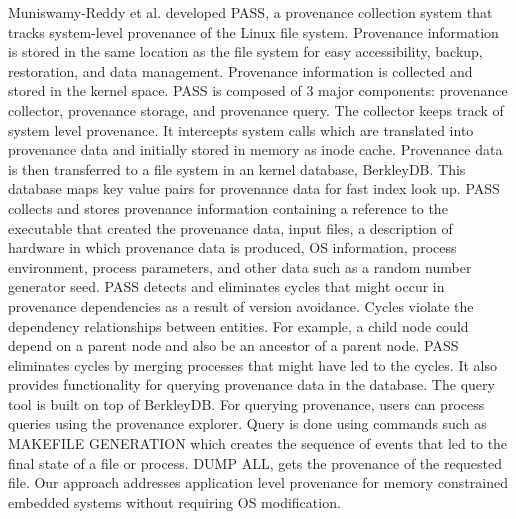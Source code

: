 Muniswamy-Reddy
et al. \cite{muniswamy_reddy} developed PASS, a provenance collection system that tracks  system-level provenance of the Linux file system. Provenance information
is stored in the same location as the file system for easy accessibility, backup,
restoration, and data management. Provenance information is collected and stored in
the kernel space. PASS is composed of 3 major components: provenance collector, provenance storage, and provenance query. The collector keeps track of system level provenance. It intercepts system calls which are translated into provenance data and initially stored in memory as inode cache. Provenance data is then transferred to a file system in an kernel database, BerkleyDB. This database maps key value pairs for provenance data for fast index look up. PASS collects and stores provenance information containing a reference to the executable that created the provenance data, input files, a description of hardware in which provenance data is produced, OS information, process environment, process parameters, and other data such as a random number generator seed. PASS detects and eliminates cycles that might occur in provenance dependencies as a result of version avoidance. Cycles violate the dependency relationships between entities. For example, a child node could depend on a parent node and also be an ancestor of a parent node. PASS eliminates cycles by merging processes that might have led to the cycles. It also provides functionality for querying provenance data in the database. The query tool is built on top of BerkleyDB. For querying provenance, users can process queries using the provenance explorer. Query is done using commands such as MAKEFILE  GENERATION which creates the sequence of events that led to the final state of a file or process. DUMP ALL, gets the provenance of the requested file. Our approach addresses application level provenance for memory constrained embedded systems without requiring OS modification.


